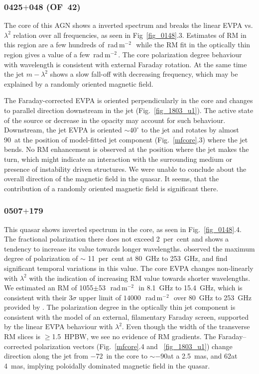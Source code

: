 \documentclass[a4paper,fleqn,usenatbib,useAMS]{mnras}
\newcommand{\rmu}{\,rad\,m$^{-2}$\,} %
\begin{document}
\subsubsection{0425$+$048 (OF~42)}
The core of this AGN shows a inverted spectrum and breaks the linear EVPA vs. $\lambda^2$ relation over all frequencies, as seen in Fig~\ref{fig_0148}.3. 
Estimates of RM in this region are a few hundreds of \rmu\, while the RM fit in the optically thin region gives a value of a few \rmu.
The core polarization degree behaviour with wavelength is consistent with external Faraday rotation. 
At the same time the jet $m-\lambda^2$ shows a slow fall-off with decreasing frequency, which may be explained by a randomly oriented magnetic field.

The Faraday-corrected EVPA is oriented perpendicularly in the core and changes to parallel direction downstream in the jet (Fig.~\ref{fig_1803_u1}).
The active state of the source or decrease in the opacity may account for such behaviour.
Downstream, the jet EVPA is oriented $\sim40^{\circ}$ to the jet and rotates by almost 90\degr\ at the position of model-fitted jet component (Fig.~\ref{mfcore}.3) where the jet bends.
No RM enhancement is observed at the position where the jet makes the turn, which might indicate an interaction with the surrounding medium or presence of instability driven structures. 
We were unable to conclude about the overall direction of the magnetic field in the quasar. 
It seems, that the contribution of a randomly oriented magnetic field is significant there.


\subsubsection{0507$+$179}
This quasar shows inverted spectrum in the core, as seen in Fig.~\ref{fig_0148}.4. 
The fractional polarization there does not exceed 2~per~cent and shows a tendency to increase its value towards longer wavelengths. 
\citet{trippe_etal12} observed the maximum degree of polarization of $\sim$ 11~per~cent at 80~GHz to 253~GHz, and find significant temporal variations in this value.
The core EVPA changes non-linearly with $\lambda^2$ with the indication of increasing RM value towards shorter wavelengths. 
We estimated an RM of 1055$\pm$53~\rmu\ in 8.1~GHz to 15.4~GHz, which is consistent with their 3$\sigma$ upper limit of $14000$~\rmu\ over 80~GHz to 253~GHz provided by \citeauthor{trippe_etal12}.
The polarization degree in the optically thin jet component is consistent with the model of an external, filamentary Faraday screen, supported by the linear EVPA behaviour with $\lambda^2$.
Even though the width of the transverse RM slices is $\geq$1.5~HPBW, we see no evidence of RM gradients. 
The Faraday--corrected polarization vectors (Fig.~\ref{mfcore}.4 and ~\ref{fig_1803_u1}) change direction along the jet from $-$72\degr\ in the core to $\sim-$90\degr at a 2.5~mas, and 62\degr at 4~mas, implying poloidally dominated magnetic field in the quasar.
\end{document}
